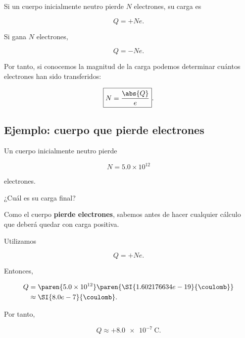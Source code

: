 Si un cuerpo inicialmente neutro pierde \(N\) electrones, su carga es

\begin{equation}
    Q=+Ne.
    \label{eq:carga_perdida_electrones}
\end{equation}

Si gana \(N\) electrones,

\begin{equation}
    Q=-Ne.
    \label{eq:carga_ganada_electrones}
\end{equation}

Por tanto, si conocemos la magnitud de la carga podemos determinar cuántos
electrones han sido transferidos:

\begin{equation}
    \boxed{
    N=\frac{\abs{Q}}{e}
    }.
    \label{eq:numero_electrones_carga}
\end{equation}



\subsection{Ejemplo: cuerpo que pierde electrones}

\begin{ejemplo}
Un cuerpo inicialmente neutro pierde

\[
N=5.0\times10^{12}
\]

electrones.

¿Cuál es su carga final?
\end{ejemplo}

Como el cuerpo \textbf{pierde electrones}, sabemos antes de hacer cualquier
cálculo que deberá quedar con carga positiva.

Utilizamos

\[
Q=+Ne.
\]

Entonces,

\begin{align}
    Q
    &=
    \paren{5.0\times10^{12}}
    \paren{\SI{1.602176634e-19}{\coulomb}}
    \\
    &\approx
    \SI{8.0e-7}{\coulomb}.
\end{align}

Por tanto,

\begin{equation}
    \boxed{
    Q\approx+\SI{8.0e-7}{\coulomb}
    }.
\end{equation}

